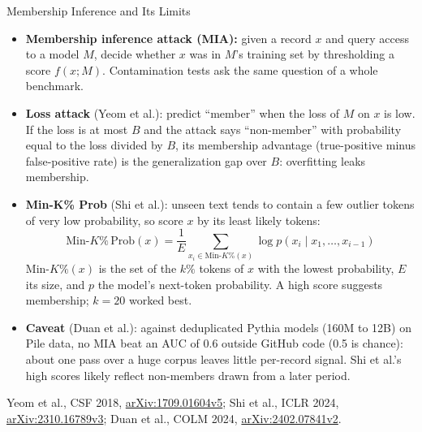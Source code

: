 \begin{frame}{Membership Inference and Its Limits}
  \begin{itemize}\footnotesize\itemsep0.2em
    \item[\textcolor{red}{$\blacktriangleright$}] \textbf{Membership inference attack (MIA):} given a record $x$ and query access to a model $M$, decide whether $x$ was in $M$'s training set by thresholding a score $f(x;M)$. Contamination tests ask the same question of a whole benchmark.
    \item[\textcolor{red}{$\blacktriangleright$}] \textbf{Loss attack} (Yeom et al.): predict ``member'' when the loss of $M$ on $x$ is low. If the loss is at most $B$ and the attack says ``non-member'' with probability equal to the loss divided by $B$, its membership advantage (true-positive minus false-positive rate) is the generalization gap over $B$: overfitting leaks membership.
    \item[\textcolor{red}{$\blacktriangleright$}] \textbf{Min-K\% Prob} (Shi et al.): unseen text tends to contain a few outlier tokens of very low probability, so score $x$ by its least likely tokens:
      \[ \text{Min-}K\%\,\text{Prob}(x) = \frac{1}{E} \sum_{x_i \in \text{Min-}K\%(x)} \log p(x_i \mid x_1, \ldots, x_{i-1}) \]
      $\text{Min-}K\%(x)$ is the set of the $k\%$ tokens of $x$ with the lowest probability, $E$ its size, and $p$ the model's next-token probability. A high score suggests membership; $k = 20$ worked best.
    \item[\textcolor{red}{$\blacktriangleright$}] \textbf{Caveat} (Duan et al.): against deduplicated Pythia models (160M to 12B) on Pile data, no MIA beat an AUC of 0.6 outside GitHub code (0.5 is chance): about one pass over a huge corpus leaves little per-record signal. Shi et al.'s high scores likely reflect non-members drawn from a later period.
  \end{itemize}
  \vspace{0.1em}
  {\scriptsize Yeom et al., CSF 2018, \href{https://arxiv.org/abs/1709.01604v5}{arXiv:1709.01604v5}; Shi et al., ICLR 2024, \href{https://arxiv.org/abs/2310.16789v3}{arXiv:2310.16789v3}; Duan et al., COLM 2024, \href{https://arxiv.org/abs/2402.07841v2}{arXiv:2402.07841v2}.}
\end{frame}

